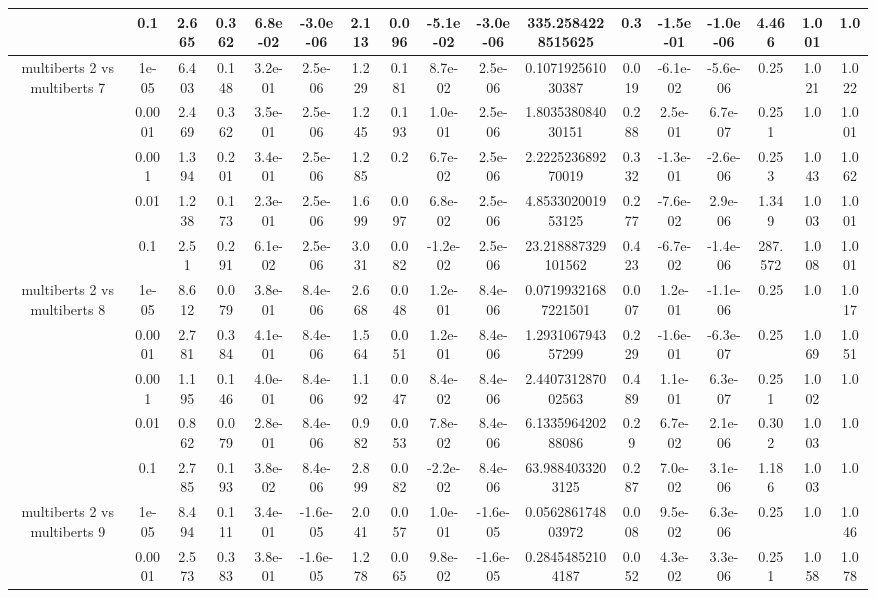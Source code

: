 \begin{tabular}{|c|c|c|c|c|c|c|c|c|c|c|c|c|c|c|c|c|}
 & 0.1 & 2.665 & 0.362 & 6.8e-02 & -3.0e-06 & 2.113 & 0.096 & -5.1e-02 & -3.0e-06 & 335.2584228515625 & 0.3 & -1.5e-01 & -1.0e-06 & 4.466 & 1.001 & 1.0 \\
\hline
\multirow{5}{*}{multiberts 2 vs multiberts 7} & 1e-05 & 6.403 & 0.148 & 3.2e-01 & 2.5e-06 & 1.229 & 0.181 & 8.7e-02 & 2.5e-06 & 0.107192561030387 & 0.019 & -6.1e-02 & -5.6e-06 & 0.25 & 1.021 & 1.022 \\
 & 0.0001 & 2.469 & 0.362 & 3.5e-01 & 2.5e-06 & 1.245 & 0.193 & 1.0e-01 & 2.5e-06 & 1.803538084030151 & 0.288 & 2.5e-01 & 6.7e-07 & 0.251 & 1.0 & 1.001 \\
 & 0.001 & 1.394 & 0.201 & 3.4e-01 & 2.5e-06 & 1.285 & 0.2 & 6.7e-02 & 2.5e-06 & 2.222523689270019 & 0.332 & -1.3e-01 & -2.6e-06 & 0.253 & 1.043 & 1.062 \\
 & 0.01 & 1.238 & 0.173 & 2.3e-01 & 2.5e-06 & 1.699 & 0.097 & 6.8e-02 & 2.5e-06 & 4.853302001953125 & 0.277 & -7.6e-02 & 2.9e-06 & 1.349 & 1.003 & 1.001 \\
 & 0.1 & 2.51 & 0.291 & 6.1e-02 & 2.5e-06 & 3.031 & 0.082 & -1.2e-02 & 2.5e-06 & 23.218887329101562 & 0.423 & -6.7e-02 & -1.4e-06 & 287.572 & 1.008 & 1.001 \\
\hline
\multirow{5}{*}{multiberts 2 vs multiberts 8} & 1e-05 & 8.612 & 0.079 & 3.8e-01 & 8.4e-06 & 2.668 & 0.048 & 1.2e-01 & 8.4e-06 & 0.07199321687221501 & 0.007 & 1.2e-01 & -1.1e-06 & 0.25 & 1.0 & 1.017 \\
 & 0.0001 & 2.781 & 0.384 & 4.1e-01 & 8.4e-06 & 1.564 & 0.051 & 1.2e-01 & 8.4e-06 & 1.293106794357299 & 0.229 & -1.6e-01 & -6.3e-07 & 0.25 & 1.069 & 1.051 \\
 & 0.001 & 1.195 & 0.146 & 4.0e-01 & 8.4e-06 & 1.192 & 0.047 & 8.4e-02 & 8.4e-06 & 2.440731287002563 & 0.489 & 1.1e-01 & 6.3e-07 & 0.251 & 1.002 & 1.0 \\
 & 0.01 & 0.862 & 0.079 & 2.8e-01 & 8.4e-06 & 0.982 & 0.053 & 7.8e-02 & 8.4e-06 & 6.133596420288086 & 0.29 & 6.7e-02 & 2.1e-06 & 0.302 & 1.003 & 1.0 \\
 & 0.1 & 2.785 & 0.193 & 3.8e-02 & 8.4e-06 & 2.899 & 0.082 & -2.2e-02 & 8.4e-06 & 63.9884033203125 & 0.287 & 7.0e-02 & 3.1e-06 & 1.186 & 1.003 & 1.0 \\
\hline
\multirow{5}{*}{multiberts 2 vs multiberts 9} & 1e-05 & 8.494 & 0.111 & 3.4e-01 & -1.6e-05 & 2.041 & 0.057 & 1.0e-01 & -1.6e-05 & 0.056286174803972 & 0.008 & 9.5e-02 & 6.3e-06 & 0.25 & 1.0 & 1.046 \\
 & 0.0001 & 2.573 & 0.383 & 3.8e-01 & -1.6e-05 & 1.278 & 0.065 & 9.8e-02 & -1.6e-05 & 0.28454852104187 & 0.052 & 4.3e-02 & 3.3e-06 & 0.251 & 1.058 & 1.078 \\

\end{tabular}
